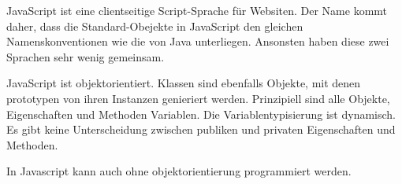 JavaScript ist eine clientseitige Script-Sprache für Websiten. Der Name kommt daher, dass die Standard-Obejekte in JavaScript den gleichen Namenskonventionen wie die von Java unterliegen. Ansonsten haben diese zwei Sprachen sehr wenig gemeinsam.

JavaScript ist objektorientiert. Klassen sind ebenfalls Objekte, mit denen prototypen von ihren Instanzen genieriert werden. Prinzipiell sind alle Objekte, Eigenschaften und Methoden Variablen. Die Variablentypisierung ist dynamisch. Es gibt keine Unterscheidung zwischen publiken und privaten Eigenschaften und Methoden.

In Javascript kann auch ohne objektorientierung programmiert werden.